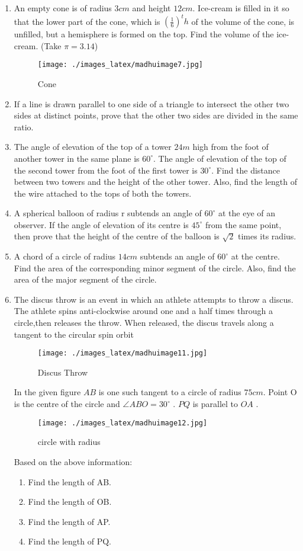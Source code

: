 \documentclass{article}
\begin{document}
\begin{enumerate}
\item An empty cone is of radius $3 cm$ and height $12 cm$. Ice-cream is filled in it so that the lower part of the cone, which is $(\frac{1}{6})^th$ of the volume of the cone, is unfilled, but a hemisphere is formed on the top. Find the volume of the ice-cream. (Take $\pi = 3.14$) 
\begin{figure}[H]
\centering
\texttt{[image: ./images\_latex/madhuimage7.jpg]}
\label{fig:fig7}
\caption{Cone}
\end{figure}
\item If a line is drawn parallel to one side of a triangle to intersect the other two sides at distinct points, prove that the other two sides are divided in the same ratio.
\item  The angle of elevation of the top of a tower $24m$ high from the foot of another tower in the same plane is $60^\circ$. The angle of elevation of the top of the second tower from the foot of the first tower is $30^\circ$. Find the distance between two towers and the height of the other tower. Also, find the length of the wire attached to the tops of both the towers.
\item A spherical balloon of radius r subtends an angle of $60^\circ$ at the eye of an observer. If the angle of elevation of its centre is $45^\circ$ from the same point, then prove that the height of the centre of the balloon is $\sqrt{2}$ times its radius. 
\item  A chord of a circle of radius $14 cm$ subtends an angle of $60^\circ$ at the centre. Find the area of the corresponding minor segment of the circle. Also, find the area of the major segment of the circle.
\item The discus throw is an event in which an athlete attempts to throw a discus. The athlete spins anti-clockwise around one and a half times through a circle,then releases the throw. When released, the discus travels along a tangent to the circular spin orbit                                                         
\begin{figure}[H]
\centering  
\texttt{[image: ./images\_latex/madhuimage11.jpg]}
\label{fig:fig11}
\caption{Discus Throw}
\end{figure}
In the given figure $AB$  is one such tangent to a circle of radius $75 cm$. Point O  is the centre of the circle and  $\angle ABO = 30^\circ$ . $PQ$  is parallel to  $OA$ .
\begin{figure}[H]
\centering
\texttt{[image: ./images\_latex/madhuimage12.jpg]}
\label{fig:fig12}
\caption{circle with radius}
\end{figure}
Based on the above information:
\begin{enumerate}
\item Find the length of AB.
\item Find the length of OB.
\item Find the length of AP.
\item Find the length of PQ. 
\end{enumerate}

\end{enumerate}
\end{document}
